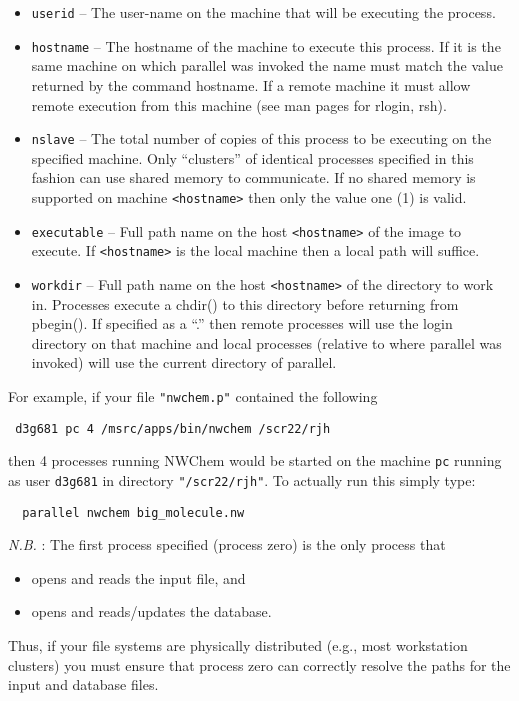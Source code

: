 \begin{itemize}
\item \verb+userid+ -- The user-name on the machine that will be executing the
      process. 

\item \verb+hostname+ --  The hostname of the machine to execute this process.
             If it is the same machine on which parallel was invoked
             the name must match the value returned by the command 
             hostname. If a remote machine it must allow remote execution
             from this machine (see man pages for rlogin, rsh).

\item \verb+nslave+ --  The total number of copies of this process to be executing
             on the specified machine. Only ``clusters'' of identical processes
             specified in this fashion can use shared memory to communicate.
             If no shared memory is supported on machine \verb+<hostname>+ then
             only the value one (1) is valid.

\item \verb+executable+ --  Full path name on the host \verb+<hostname>+ of the image to execute.
             If \verb+<hostname>+ is the local machine then a local path will
             suffice.

\item \verb+workdir+ --  Full path name on the host \verb+<hostname>+ of the directory to
             work in. Processes execute a chdir() to this directory before
             returning from pbegin(). If specified as a ``.'' then remote
             processes will use the login directory on that machine and local
             processes (relative to where parallel was invoked) will use
             the current directory of parallel.
\end{itemize}

  For example, if your file \verb+"nwchem.p"+ contained the following
\begin{verbatim}
 d3g681 pc 4 /msrc/apps/bin/nwchem /scr22/rjh
\end{verbatim}
then 4 processes running NWChem would be started on the machine 
\verb+pc+ running as user \verb+d3g681+ in directory \verb+"/scr22/rjh"+.
To actually run this simply type:
\begin{verbatim}
  parallel nwchem big_molecule.nw
\end{verbatim}

{\em N.B.} : The first process specified (process zero) is the only
process that
\begin{itemize}
\item opens and reads the input file, and
\item opens and reads/updates the database.
\end{itemize}
Thus, if your file systems are physically distributed (e.g., most
workstation clusters) you must ensure that process zero can correctly
resolve the paths for the input and database files.

